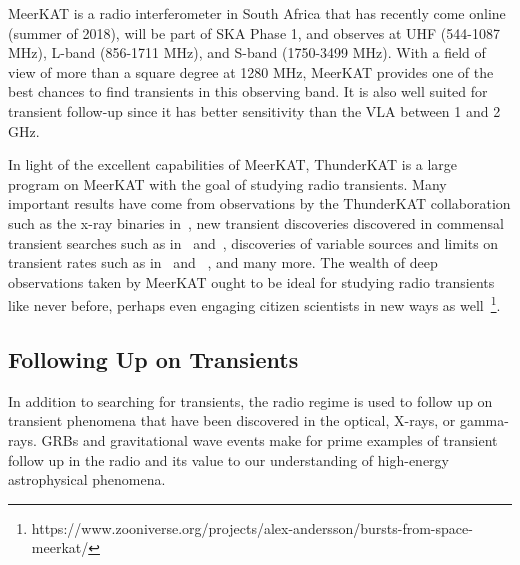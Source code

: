 \documentclass[12pt]{article}
\begin{document}
MeerKAT \cite{2016mks..confE...1J} is a radio interferometer in South Africa that has recently come online (summer of 2018), will be part of SKA Phase 1, and observes at UHF (544-1087 MHz), L-band (856-1711 MHz), and S-band (1750-3499 MHz). With a field of view of more than a square degree at 1280 MHz, MeerKAT provides one of the best chances to find transients in this observing band. It is also well suited for transient follow-up since it has better sensitivity than the VLA between 1 and 2 GHz. 

In light of the excellent capabilities of MeerKAT, ThunderKAT \cite{2016mks..confE..13W} is a large program on MeerKAT with the goal of studying radio transients. Many important results have come from observations by the ThunderKAT collaboration such as the x-ray binaries in~\citet{2020NatAs...4..697B}, new transient discoveries discovered in commensal transient searches such as in~\citet{2020MNRAS.491..560D} and~\citet{2022MNRAS.513.3482A}, discoveries of variable sources and limits on transient rates such as in~\citet{2022MNRAS.517.2894R} and ~\citet{commensal1}, and many more. The wealth of deep observations taken by MeerKAT ought to be ideal for studying radio transients like never before, perhaps even engaging citizen scientists in new ways as well~\footnote{https://www.zooniverse.org/projects/alex-andersson/bursts-from-space-meerkat/}.

\subsection{Following Up on Transients}
In addition to searching for transients, the radio regime is used to follow up on transient phenomena that have been discovered in the optical, X-rays, or gamma-rays. GRBs and gravitational wave events make for prime examples of transient follow up in the radio and its value to our understanding of high-energy astrophysical phenomena. 
\end{document}
